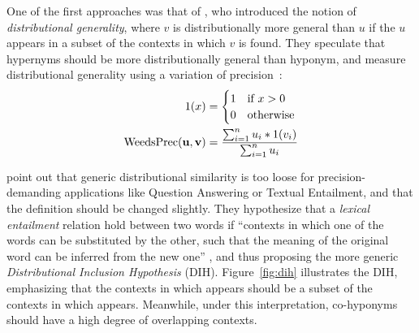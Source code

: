 One of the first approaches was that of , who
introduced the notion of \emph{distributional generality}, where $v$ is
distributionally more general than $u$ if the $u$ appears in a subset of
the contexts in which $v$ is found. They speculate that hypernyms should be
more distributionally general than hyponym, and measure distributional
generality using a variation of
precision~\cite{weeds:2003:emnlp,weeds:2004:coling}:
\begin{align}
  1(x) & = \begin{cases}1 & \mbox{if } x > 0\\
    0 & \mbox{otherwise}
  \end{cases}\\
  \mbox{WeedsPrec}({\mathbf{u}}, {\mathbf{v}}) & = \frac{\sum_{i=1}^n u_i * 1(v_i)}{\sum_{i=1}^n u_i}
  \label{eq:weeds}
\end{align}

 point out that generic
distributional similarity is too loose for precision-demanding applications
like Question Answering or Textual Entailment, and that the definition should
be changed slightly. They hypothesize that a {\em lexical entailment} relation
hold between two words if ``contexts in which one of the words can be
substituted by the other, such that the meaning of the original word can be
inferred from the new one'' \cite{zhitomirskygeffet:2005:acl}, and thus
proposing the more generic {\em Distributional Inclusion Hypothesis} (DIH).
Figure~\ref{fig:dih} illustrates the DIH, emphasizing that the contexts in
which  appears should be a subset of the contexts in which
 appears. Meanwhile, under this interpretation, co-hyponyms should
have a high degree of overlapping contexts.

